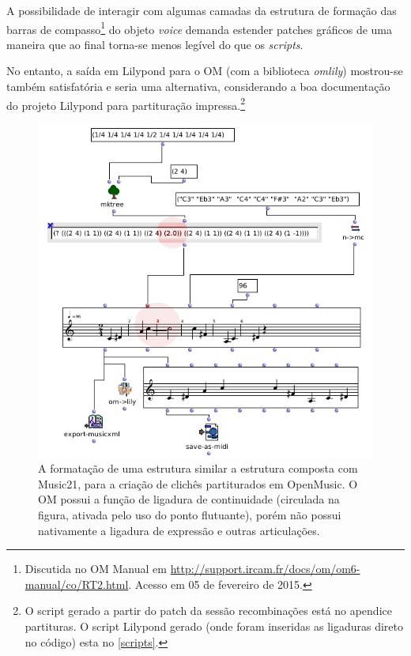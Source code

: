 \documentclass[
	12pt,				%
	openright,			%
	twoside,			%
	a4paper,			%
	english,			%
	french,				%
	spanish,			%
	brazil				%
	]{abntex2}
\begin{document}
A possibilidade de interagir com algumas camadas da estrutura de formação das barras de compasso\footnote{Discutida no OM Manual em \url{http://support.ircam.fr/docs/om/om6-manual/co/RT2.html}. Acesso em 05 de fevereiro de 2015.} do objeto \textit{voice} demanda estender patches gráficos de uma maneira que ao final torna-se menos legível do que os \textit{scripts}.

No entanto, a saída em Lilypond para o OM (com a biblioteca \textit{omlily}) mostrou-se também satisfatória e seria uma alternativa, considerando a boa documentação do projeto Lilypond para partituração impressa.\footnote{O script gerado a partir do patch da sessão recombinações está no apendice partituras. O script Lilypond gerado (onde foram inseridas as ligaduras direto no código) esta no \autoref{scripts}. }

\begin{figure}[!h]
	\caption{\label{fig_grafico}A formatação de uma estrutura similar a estrutura composta com Music21, para a criação de clichês partiturados em OpenMusic. O OM possui a função de ligadura de continuidade (circulada na figura, ativada pelo uso do ponto flutuante), porém não possui nativamente a ligadura de expressão e outras articulações. }
	\begin{center}
	    \includegraphics[scale=0.6]{OMPD/PolirritmoOM.png}
	\end{center}
\end{figure}
\end{document}
